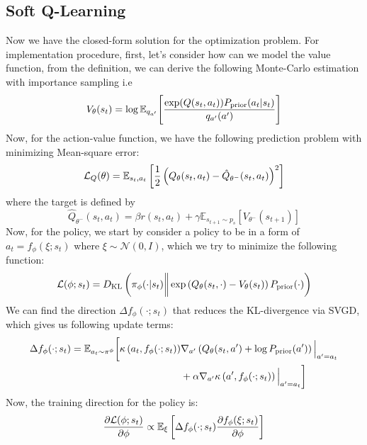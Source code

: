 \subsection{Soft Q-Learning}
\label{sec:chap2-soft-q-implementation}
Now we have the closed-form solution for the optimization problem. For implementation procedure, first, let's consider how can we model the value function, from the definition, we can derive the following Monte-Carlo estimation with importance sampling i.e 
\begin{equation}
    V_{\theta}(s_t) = \log \mathbb{E}_{q_{a'}}\Bigg[ \frac{\exp(Q(s_t, a_t)) P_{\text{prior}}(a_t | s_t)}{q_{a'}(a')} \Bigg]
\end{equation}
Now, for the action-value function, we have the following prediction problem with minimizing Mean-square error:
\begin{equation}
\label{eqn:chap2-soft-Q-mse}
    \mathcal{L}_Q(\theta) = \mathbb{E}_{s_t, a_t}\left[ \frac{1}{2} \left( Q_{\theta}(s_t, a_t) - \hat{Q}_{\theta^-}(s_t, a_t)  \right)^2 \right]
\end{equation}
where the target is defined by
\begin{equation}
\label{eqn:chap2-soft-Q-mse-target}
    \hat{Q}_{\theta^-}(s_t, a_t) = \beta r(s_t, a_t) + \gamma \mathbb{E}_{s_{t+1} \sim p_{s}}\left[ V_{\theta^-}(s_{t+1}) \right]
\end{equation}
Now, for the policy, we start by consider a policy to be in a form of $a_t = f_{\phi}(\xi ; s_t)$ where $\xi \sim \mathcal{N}(0, I)$, which we try to minimize the following function:
\begin{equation}
    \mathcal{L}(\phi ; s_t) = D_{\mathrm{KL}}\left( \pi_{\phi}(\cdot | s_t) \bigg\| \exp\left( Q_{\theta}(s_t, \cdot) - V_{\theta}(s_t)  \right) P_{\text{prior}}(\cdot) \right)
\end{equation}
We can find the direction $\Delta f_{\phi}(\cdot ; s_t)$ that reduces the KL-divergence via SVGD, which gives us following update terms:
\begin{equation}
    \begin{aligned}
        \Delta f_{\phi}(\cdot ; s_t) = \mathbb{E}_{a_t \sim \pi^{\phi}}\bigg[ \kappa \left( a_t, f_{\phi}(\cdot ; s_t) \right) &\nabla_{a'} \left( Q_{\theta}(s_t, a') + \log P_{\text{prior}}(a') \right) \Big|_{a' = a_t} \\
        &+ \alpha \nabla_{a'} \kappa \left( a', f_{\phi}(\cdot ; s_t) \right) \Big|_{a' = a_t} \bigg]
    \end{aligned}
\end{equation}
Now, the training direction for the policy is:
\begin{equation}
    \frac{\partial \mathcal{L}(\phi ; s_t)}{\partial \phi} \propto \mathbb{E}_{\xi} \left[ \Delta f_{\phi}(\cdot ; s_t) \frac{\partial f_{\phi}(\xi ; s_t)}{\partial \phi} \right]
\end{equation}

